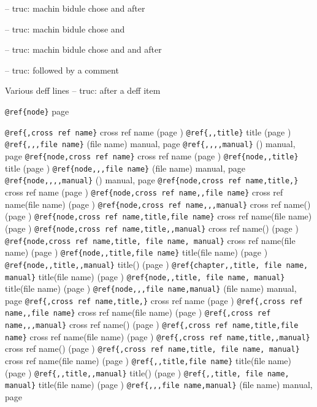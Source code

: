\documentclass{book}
\begin{document}
\begin{titlepage}
\hbox{}-- truc: machin bidule chose and  after


\hbox{}-- truc: machin bidule chose and 


\hbox{}-- truc: machin bidule chose and and after


\hbox{}-- truc: followed by a comment


Various deff lines
\hbox{}-- truc: after a deff item



\texttt{@ref\{node\}} page \pageref{anchor:node}

\texttt{@ref\{,cross ref name\}} cross ref name (page \pageref{anchor:})
\texttt{@ref\{,,title\}} title (page \pageref{anchor:})
\texttt{@ref\{,,,file name\}} (file name) manual, page \pageref{anchor:}
\texttt{@ref\{,,,,manual\}} () manual, page \pageref{anchor:}
\texttt{@ref\{node,cross ref name\}} cross ref name (page \pageref{anchor:node})
\texttt{@ref\{node,,title\}} title (page \pageref{anchor:node})
\texttt{@ref\{node,,,file name\}} (file name) manual, page \pageref{anchor:node}
\texttt{@ref\{node,,,,manual\}} () manual, page \pageref{anchor:node}
\texttt{@ref\{node,cross ref name,title,\}} cross ref name (page \pageref{anchor:node})
\texttt{@ref\{node,cross ref name,,file name\}} cross ref name(file name) (page \pageref{anchor:node})
\texttt{@ref\{node,cross ref name,,,manual\}} cross ref name() (page \pageref{anchor:node})
\texttt{@ref\{node,cross ref name,title,file name\}} cross ref name(file name) (page \pageref{anchor:node})
\texttt{@ref\{node,cross ref name,title,,manual\}} cross ref name() (page \pageref{anchor:node})
\texttt{@ref\{node,cross ref name,title, file name, manual\}} cross ref name(file name) (page \pageref{anchor:node})
\texttt{@ref\{node,,title,file name\}} title(file name) (page \pageref{anchor:node})
\texttt{@ref\{node,,title,,manual\}} title() (page \pageref{anchor:node})
\texttt{@ref\{chapter,,title, file name, manual\}} title(file name) (page \pageref{anchor:chapter})
\texttt{@ref\{node,,title, file name, manual\}} title(file name) (page \pageref{anchor:node})
\texttt{@ref\{node,,,file name,manual\}} (file name) manual, page \pageref{anchor:node}
\texttt{@ref\{,cross ref name,title,\}} cross ref name (page \pageref{anchor:})
\texttt{@ref\{,cross ref name,,file name\}} cross ref name(file name) (page \pageref{anchor:})
\texttt{@ref\{,cross ref name,,,manual\}} cross ref name() (page \pageref{anchor:})
\texttt{@ref\{,cross ref name,title,file name\}} cross ref name(file name) (page \pageref{anchor:})
\texttt{@ref\{,cross ref name,title,,manual\}} cross ref name() (page \pageref{anchor:})
\texttt{@ref\{,cross ref name,title, file name, manual\}} cross ref name(file name) (page \pageref{anchor:})
\texttt{@ref\{,,title,file name\}} title(file name) (page \pageref{anchor:})
\texttt{@ref\{,,title,,manual\}} title() (page \pageref{anchor:})
\texttt{@ref\{,,title, file name, manual\}} title(file name) (page \pageref{anchor:})
\texttt{@ref\{,,,file name,manual\}} (file name) manual, page \pageref{anchor:}


\end{titlepage}
\end{document}
